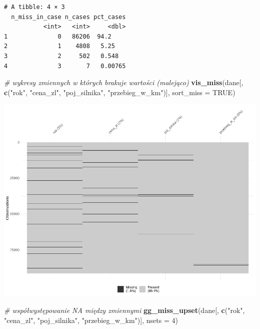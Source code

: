 \documentclass[
]{article}
\newenvironment{Shaded}{\begin{snugshade}}{\end{snugshade}}
\newcommand{\AttributeTok}[1]{\textcolor[rgb]{0.13,0.29,0.53}{#1}}
\newcommand{\CommentTok}[1]{\textcolor[rgb]{0.56,0.35,0.01}{\textit{#1}}}
\newcommand{\ConstantTok}[1]{\textcolor[rgb]{0.56,0.35,0.01}{#1}}
\newcommand{\DecValTok}[1]{\textcolor[rgb]{0.00,0.00,0.81}{#1}}
\newcommand{\FunctionTok}[1]{\textcolor[rgb]{0.13,0.29,0.53}{\textbf{#1}}}
\newcommand{\NormalTok}[1]{#1}
\newcommand{\StringTok}[1]{\textcolor[rgb]{0.31,0.60,0.02}{#1}}
\begin{document}
\begin{verbatim}
# A tibble: 4 × 3
  n_miss_in_case n_cases pct_cases
           <int>   <int>     <dbl>
1              0   86206  94.2    
2              1    4808   5.25   
3              2     502   0.548  
4              3       7   0.00765
\end{verbatim}

\begin{Shaded}
\begin{Highlighting}[]
\CommentTok{\# wykresy zmiennych w których brakuje wartości (malejąco)}
\FunctionTok{vis\_miss}\NormalTok{(dane[, }\FunctionTok{c}\NormalTok{(}\StringTok{"rok"}\NormalTok{, }\StringTok{"cena\_zl"}\NormalTok{, }\StringTok{"poj\_silnika"}\NormalTok{, }\StringTok{"przebieg\_w\_km"}\NormalTok{)], }\AttributeTok{sort\_miss =} \ConstantTok{TRUE}\NormalTok{)}
\end{Highlighting}
\end{Shaded}

\includegraphics[width=1\linewidth]{images/1}

\begin{Shaded}
\begin{Highlighting}[]
\CommentTok{\# współwystępowanie NA między zmiennymi}
\FunctionTok{gg\_miss\_upset}\NormalTok{(dane[, }\FunctionTok{c}\NormalTok{(}\StringTok{"rok"}\NormalTok{, }\StringTok{"cena\_zl"}\NormalTok{, }\StringTok{"poj\_silnika"}\NormalTok{, }\StringTok{"przebieg\_w\_km"}\NormalTok{)], }
              \AttributeTok{nsets =} \DecValTok{4}\NormalTok{)}
\end{Highlighting}
\end{Shaded}
\end{document}
